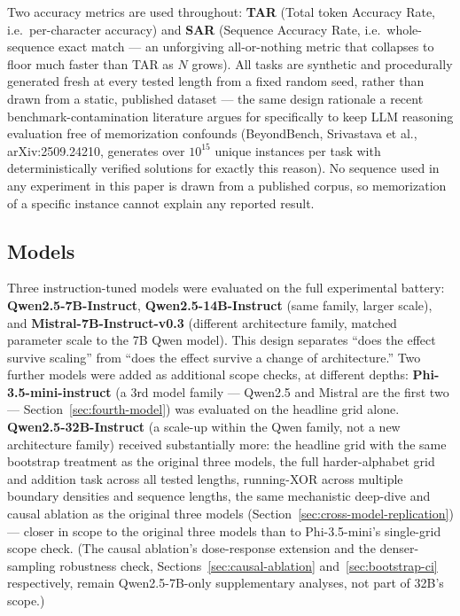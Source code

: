 \documentclass[11pt]{article}
\begin{document}
Two accuracy metrics are used throughout: \textbf{TAR} (Total token Accuracy Rate, i.e.\ per-character accuracy) and \textbf{SAR} (Sequence Accuracy Rate, i.e.\ whole-sequence exact match --- an unforgiving all-or-nothing metric that collapses to floor much faster than TAR as $N$ grows). All tasks are synthetic and procedurally generated fresh at every tested length from a fixed random seed, rather than drawn from a static, published dataset --- the same design rationale a recent benchmark-contamination literature argues for specifically to keep LLM reasoning evaluation free of memorization confounds (BeyondBench, Srivastava et al., arXiv:2509.24210, generates over $10^{15}$ unique instances per task with deterministically verified solutions for exactly this reason). No sequence used in any experiment in this paper is drawn from a published corpus, so memorization of a specific instance cannot explain any reported result.

\subsection{Models}

Three instruction-tuned models were evaluated on the full experimental battery: \textbf{Qwen2.5-7B-Instruct}, \textbf{Qwen2.5-14B-Instruct} (same family, larger scale), and \textbf{Mistral-7B-Instruct-v0.3} (different architecture family, matched parameter scale to the 7B Qwen model). This design separates ``does the effect survive scaling'' from ``does the effect survive a change of architecture.'' Two further models were added as additional scope checks, at different depths: \textbf{Phi-3.5-mini-instruct} (a 3rd model family --- Qwen2.5 and Mistral are the first two --- Section~\ref{sec:fourth-model}) was evaluated on the headline grid alone. \textbf{Qwen2.5-32B-Instruct} (a scale-up within the Qwen family, not a new architecture family) received substantially more: the headline grid with the same bootstrap treatment as the original three models, the full harder-alphabet grid and addition task across all tested lengths, running-XOR across multiple boundary densities and sequence lengths, the same mechanistic deep-dive and causal ablation as the original three models (Section~\ref{sec:cross-model-replication}) --- closer in scope to the original three models than to Phi-3.5-mini's single-grid scope check. (The causal ablation's dose-response extension and the denser-sampling robustness check, Sections~\ref{sec:causal-ablation} and~\ref{sec:bootstrap-ci} respectively, remain Qwen2.5-7B-only supplementary analyses, not part of 32B's scope.)
\end{document}
